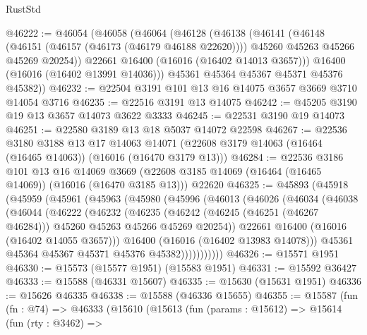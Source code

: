 \begin{lexlean}{RustStd}
\begin{coremodule}
@46222 := @46054
    (@46058
      (@46064
        (@46128
          (@46138
            (@46141
              (@46148
                (@46151 (@46157 (@46173 (@46179 @46188 @22620))))
                @45260
                @45263
                @45266
                @45269
                @20254))
            @22661
            @16400
            (@16016 (@16402 @14013 @3657)))
          @16400
          (@16016 (@16402 @13991 @14036)))
        @45361
        @45364
        @45367
        @45371
        @45376
        @45382))
@46232 := @22504 @3191 @101 @13 @16 @14075 @3657 @3669 @3710 @14054 @3716
@46235 := @22516 @3191 @13 @14075
@46242 := @45205 @3190 @19 @13 @3657 @14073 @3622 @3333
@46245 := @22531 @3190 @19 @14073
@46251 := @22580 @3189 @13 @18 @5037 @14072 @22598
@46267 := @22536
    @3180
    @3188
    @13
    @17
    @14063
    @14071
    (@22608 @3179 @14063 (@16464 (@16465 @14063)) (@16016 (@16470 @3179 @13)))
@46284 := @22536
    @3186
    @101
    @13
    @16
    @14069
    @3669
    (@22608 @3185 @14069 (@16464 (@16465 @14069)) (@16016 (@16470 @3185 @13)))
    @22620
@46325 := @45893
    (@45918
      (@45959
        (@45961
          (@45963
            (@45980
              (@45996
                (@46013
                  (@46026
                    (@46034
                      (@46038
                        (@46044
                          (@46222
                            (@46232
                              (@46235
                                (@46242
                                  (@46245 (@46251 (@46267 @46284)))
                                  @45260
                                  @45263
                                  @45266
                                  @45269
                                  @20254))
                              @22661
                              @16400
                              (@16016 (@16402 @14055 @3657)))
                            @16400
                            (@16016 (@16402 @13983 @14078)))
                          @45361
                          @45364
                          @45367
                          @45371
                          @45376
                          @45382)))))))))))
@46326 := @15571 @1951
@46330 := @15573 (@15577 @1951) (@15583 @1951)
@46331 := @15592 @36427
@46333 := @15588 (@46331 @15607)
@46335 := @15630 (@15631 @1951)
@46336 := @15626 @46335
@46338 := @15588 (@46336 @15655)
@46355 := @15587
    (fun (fn : @74) =>
    @46333
      (@15610
        (@15613
          (fun (params : @15612) =>
          @15614
            (fun (rty : @3462) =>

\end{coremodule}
\end{lexlean}
